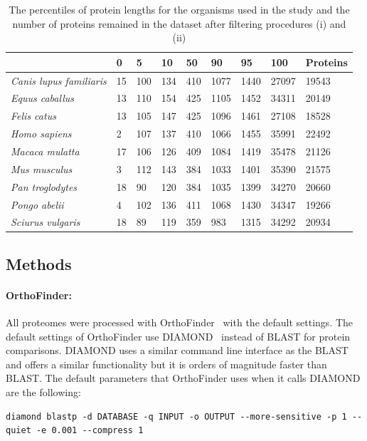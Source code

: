 \documentclass[12pt]{article}
\begin{document}
\begin{table}[htbp!]
  \caption{The percentiles of protein lengths for the organisms used
    in the study and the number of proteins remained in the dataset after filtering procedures (i) and (ii)}
  \label{tab:lengthdist}
  \begin{tabular}{|l|lllllll||l|}
    
    & 0 & 5  & 10  & 50  & 90   & 95   & 100 & Proteins
    \\
    \hline
    {\it Canis lupus familiaris} & 15 & 100 & 134 & 410  & 1077 & 1440  & 27097 & 19543 \\
    {\it Equus caballus}          & 13 & 110 & 154 & 425  & 1105 & 1452  & 34311 & 20149\\
    {\it Felis catus}             & 13 & 105 & 147 & 425  & 1096 & 1461  & 27108 & 18528\\
    {\it Homo sapiens}            & 2  & 107 & 137 & 410  & 1066 & 1455  & 35991 & 22492 \\
    {\it Macaca mulatta}          & 17 & 106 & 126 & 409  & 1084 & 1419  & 35478 & 21126\\
    {\it Mus musculus}            & 3  & 112 & 143 & 384  & 1033 & 1401  & 35390 & 21575\\
    {\it Pan troglodytes} & 18      & 90 & 120 & 384 & 1035 & 1399 & 34270 & 20660\\
    {\it Pongo abelii}            & 4  & 102 & 136 & 411  & 1068 & 1430  & 34347 & 19266\\
    {\it Sciurus vulgaris}        & 18 & 89  & 119 & 359  & 983  & 1315  &  34292 & 20934\\
    
  \end{tabular}
\end{table}

\subsection*{Methods}
\paragraph{OrthoFinder:} All proteomes were processed with
OrthoFinder~\citep{emms2019orthofinder} with the default settings. The
default settings of OrthoFinder use DIAMOND~\citep{buchfink2015fast}
instead of BLAST for protein comparisons. DIAMOND uses a similar
command line interface as the BLAST and offers a similar functionality
but it is orders of magnitude faster than BLAST. The default
parameters that OrthoFinder uses when it calls DIAMOND are the
following: 
\begin{lstlisting}[breaklines]
diamond blastp -d DATABASE -q INPUT -o OUTPUT --more-sensitive -p 1 --quiet -e 0.001 --compress 1
\end{lstlisting}
\end{document}
